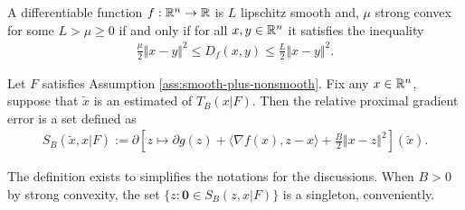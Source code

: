 \documentclass[12pt]{article}
\begin{document}
        \begin{definition}\label{def:lip-smooth-and-scnvx}
            A differentiable function $f: \mathbb R^n \rightarrow \mathbb R$ is $L$ lipschitz smooth and, $\mu$ strong convex for some $L > \mu \ge 0$ if and only if for all $x, y \in \mathbb R^n$ it satisfies the inequality 
            \begin{align*}
                \frac{\mu}{2}\Vert x - y\Vert^2 \le D_f(x, y) \le \frac{L}{2}\Vert x - y\Vert^2. 
            \end{align*}
        \end{definition}
        \begin{definition}\label{def:pg-err-ruler}
            Let $F$ satisfies Assumption \ref{ass:smooth-plus-nonsmooth}. 
            Fix any $x \in \mathbb R^n$, suppose that $\tilde x$ is an estimated of $T_B(x|F)$. 
            Then the relative proximal gradient error is a set defined as
            \begin{align*}
                S_B(\tilde x, x | F) := 
                \partial \left[
                    z \mapsto \partial g(z) + \langle \nabla f(x), z - x\rangle + 
                    \frac{B}{2}\Vert x - z\Vert^2
                \right](\tilde x). 
            \end{align*}
        \end{definition}
        \begin{remark}
            The definition exists to simplifies the notations for the discussions. 
            When $B > 0$ by strong convexity, the set $\{z : \mathbf 0 \in S_B(z, x | F)\}$ is a singleton, conveniently. 
        \end{remark}
\end{document}
